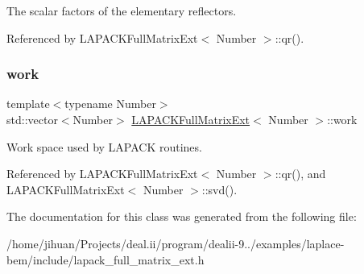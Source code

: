 The scalar factors of the elementary reflectors. 

Referenced by L\+A\+P\+A\+C\+K\+Full\+Matrix\+Ext$<$ Number $>$\+::qr().

\mbox{\label{classLAPACKFullMatrixExt_a971d29c6d7664fca553b6ba377519946}} 
\subsubsection{\texorpdfstring{work}{work}}
{\footnotesize\ttfamily template$<$typename Number$>$ \\
std\+::vector$<$Number$>$ \hyperlink{classLAPACKFullMatrixExt}{L\+A\+P\+A\+C\+K\+Full\+Matrix\+Ext}$<$ Number $>$\+::work\hspace{0.3cm}{\ttfamily [private]}}

Work space used by L\+A\+P\+A\+CK routines. 

Referenced by L\+A\+P\+A\+C\+K\+Full\+Matrix\+Ext$<$ Number $>$\+::qr(), and L\+A\+P\+A\+C\+K\+Full\+Matrix\+Ext$<$ Number $>$\+::svd().



The documentation for this class was generated from the following file\+:\begin{DoxyCompactItemize}
\item 
/home/jihuan/\+Projects/deal.\+ii/program/dealii-\/9../examples/laplace-\/bem/include/lapack\+\_\+full\+\_\+matrix\+\_\+ext.\+h\end{DoxyCompactItemize}
